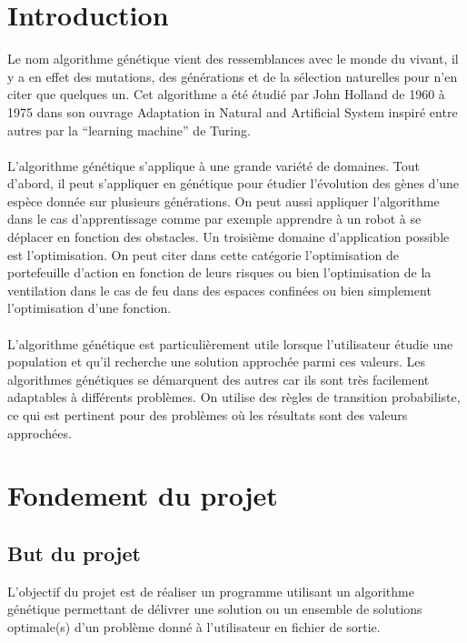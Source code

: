 \documentclass[a4paper,11pt]{article}
\title{\vspace{13em}{\huge Cahier des Charges}}
\author{Edouard Fouassier - Maxime Gonthier - Benjamin Guillot\\
		Laureline Martin - Rémi Navarro - Lydia Rodrigez de la Nava
		\vspace{2em}\\
		Algorithme Genetique
		\vspace{2em}}
\begin{document}
	
	\clearpage
	\maketitle\vspace{13em}
\newpage
\newpage\clearpage{}
	
	\section*{Introduction}
		Le nom algorithme génétique vient des ressemblances avec le monde du vivant, il y a en effet des mutations, des générations et de la sélection naturelles pour n’en citer que quelques un. 
		Cet algorithme a été étudié par John Holland de 1960 à 1975 dans son ouvrage Adaptation in Natural and Artificial System inspiré entre autres par la “learning machine” de Turing.\\
		\\
		L’algorithme génétique s’applique à une grande variété de domaines. 
		Tout d’abord, il peut s’appliquer en génétique pour étudier l’évolution des gènes d’une espèce donnée sur plusieurs générations. 
		On peut aussi appliquer l’algorithme dans le cas d’apprentissage comme par exemple apprendre à un robot à se déplacer en fonction des obstacles. 
		Un troisième domaine d’application possible est l’optimisation. 
		On peut citer dans cette catégorie l’optimisation de portefeuille d'action en fonction de leurs risques ou bien l’optimisation de la ventilation dans le cas de feu dans des espaces confinées ou bien simplement l’optimisation d’une fonction.\\ 
		\\
		L’algorithme génétique est particulièrement utile lorsque l’utilisateur étudie une population et qu’il recherche une solution approchée parmi ces valeurs. 
		Les algorithmes génétiques se démarquent des autres car ils sont très facilement adaptables à différents problèmes. 
		On utilise des règles de transition probabiliste, ce qui est pertinent pour des problèmes où les résultats sont des valeurs approchées.\\

	\section{Fondement du projet}
		\subsection{But du projet}
			L'objectif du projet est de réaliser un programme utilisant un algorithme génétique permettant de délivrer une solution ou un ensemble de solutions optimale(s) d’un problème donné à l’utilisateur en fichier de sortie.
		
\end{document}
